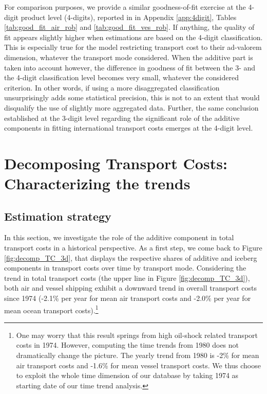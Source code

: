\documentclass[a4paper,11pt]{article}
\begin{document}
For comparison purposes, we provide a similar goodness-of-fit exercise at the 4-digit product level (4-digits), reported in in Appendix \ref{app:4digit}, Tables \ref{tab:good_fit_air_rob} and \ref{tab:good_fit_ves_rob}. If anything, the quality of fit appears slightly higher when estimations are based on the 4-digit classification. This is especially true for the model restricting transport cost to their ad-valorem dimension, whatever the transport mode considered. When the additive part is taken into account however, the difference in goodness of fit between the 3- and the 4-digit classification level becomes very small, whatever the considered criterion. In other words, if using a more disaggregated classification unsurprisingly adds some statistical precision, this is not to an extent that would disqualify the use of slightly more aggregated data. Further, the same conclusion established at the 3-digit level regarding the significant role of the additive components in fitting international transport costs emerges at the 4-digit level.



\section{Decomposing Transport Costs: Characterizing the trends }\label{sec:results_trends}
\subsection{Estimation strategy}
In this section, we investigate the role of the additive component in total transport costs in a historical perspective.
As a first step, we come back to Figure \ref{fig:decomp_TC_3d}, that displays the respective shares of additive and iceberg components in transport costs over time by transport mode. Considering the trend in total transport costs (the upper line in Figure \ref{fig:decomp_TC_3d}), both air and vessel shipping exhibit a downward trend in overall transport costs since 1974 (-2.1\% per year for mean air transport costs and -2.0\% per year for mean ocean transport costs).\footnote{One may worry that this result springs from high oil-shock related transport costs in 1974. However, computing the time trends from 1980 does not dramatically change the picture. The yearly trend from 1980 is -2\% for mean air transport costs and -1.6\% for mean vessel transport costs. We thus choose to exploit the whole time dimension of our database by taking 1974 as starting date of our time trend analysis.}
\end{document}
